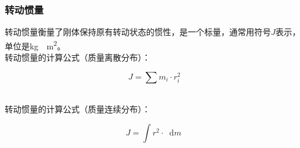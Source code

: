 \documentclass[UTF8]{ctexart}
\newcommand*{\dif}{\mathop{}\!\mathrm{d}}
\begin{document}
\newpage

\subsubsection{转动惯量}
    转动惯量衡量了刚体保持原有转动状态的惯性，是一个标量，通常用符号$J$表示，单位是\si{kg\cdot m^2}。\\[3mm]
    转动惯量的计算公式（质量离散分布）：
    \begin{large}
        \begin{equation*}
            J=\sum m_i\cdot r_i^2
        \end{equation*}
    \end{large}\\
    转动惯量的计算公式（质量连续分布）：
    \begin{large}
        \begin{equation*}
            J=\int r^2\cdot\dif m~
        \end{equation*}
    \end{large}
\end{document}
